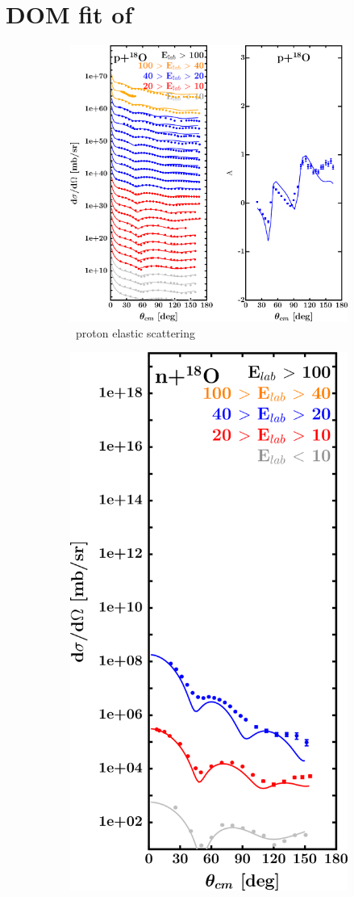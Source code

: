 \section{DOM fit of \oEight}
\label{o18DOMOutput}
\begin{figure}[hbtp]
    \captionsetup[subfigure]{labelformat=empty}
    \centering
    \begin{subfigure}[c]{0.39\textheight}
        \centering
        \includegraphics[width=\linewidth]{figures/o18_protonElastic.png}
        \caption{\oEight\ proton elastic scattering}
        \label{DOMFitData_o18_proton_elastic}
    \end{subfigure}\hspace{6pt}
    \begin{subfigure}[c]{0.39\textheight}
        \centering
        \includegraphics[width=0.52\linewidth]{figures/o18_neutronElastic.png}

\end{subfigure}
\end{figure}
